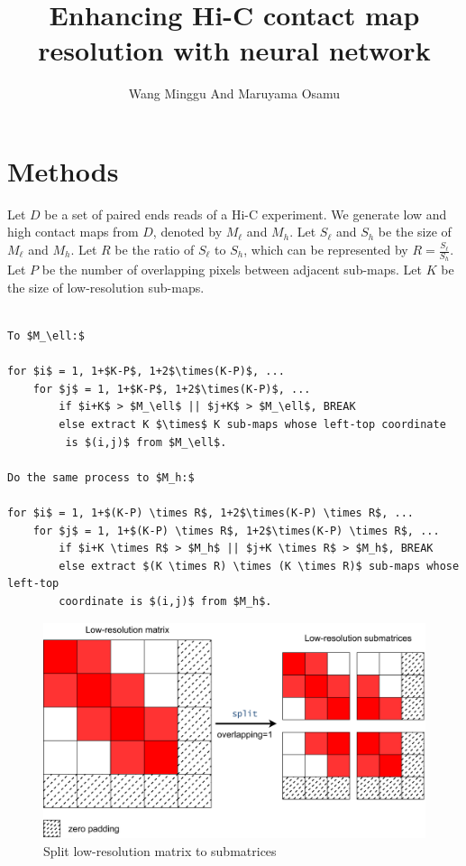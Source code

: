 \documentclass{article}
\begin{document}
\title{Enhancing Hi-C contact map resolution with neural network}
\author{Wang Minggu And Maruyama Osamu}
\maketitle



\section{Methods}


Let $D$ be a set of paired ends reads of a Hi-C experiment. 
We generate low and high contact maps from $D$, denoted by $M_\ell$ and $M_h$. 
Let $S_\ell$ and $S_h$ be the size of $M_\ell$ and $M_h$. 
Let $R$ be the ratio of $S_\ell$ to $S_h$, which can be represented by
$R = \frac{S_\ell}{S_h}$. Let $P$ be the number of overlapping pixels between adjacent sub-maps.
Let $K$ be the size of low-resolution sub-maps.

\begin{Verbatim}[commandchars=\\\{\},codes={\catcode`$=3\catcode`_=8\catcode`^=7}]
% Divide matrices $M_\ell$ and $M_h$ \

To $M_\ell:$

for $i$ = 1, 1+$K-P$, 1+2$\times(K-P)$, ...
    for $j$ = 1, 1+$K-P$, 1+2$\times(K-P)$, ...
        if $i+K$ > $M_\ell$ || $j+K$ > $M_\ell$, BREAK 
        else extract K $\times$ K sub-maps whose left-top coordinate
         is $(i,j)$ from $M_\ell$.

Do the same process to $M_h:$

for $i$ = 1, 1+$(K-P) \times R$, 1+2$\times(K-P) \times R$, ...
    for $j$ = 1, 1+$(K-P) \times R$, 1+2$\times(K-P) \times R$, ...
        if $i+K \times R$ > $M_h$ || $j+K \times R$ > $M_h$, BREAK 
        else extract $(K \times R) \times (K \times R)$ sub-maps whose left-top 
        coordinate is $(i,j)$ from $M_h$.
\end{Verbatim}

\begin{figure}[htbp]
\centering
\includegraphics[scale=0.03]{figures/lowres_split.png}
\caption{Split low-resolution matrix to submatrices}
\end{figure}
\end{document}
